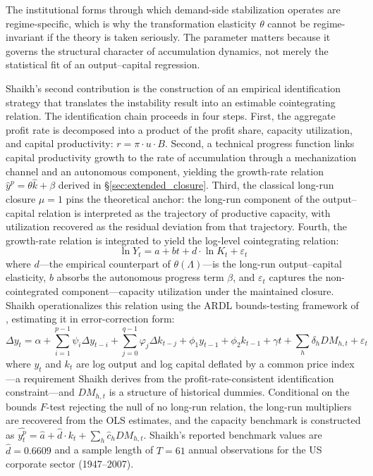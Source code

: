 The institutional forms through which demand-side stabilization operates are regime-specific, which is why the transformation elasticity $\theta$ cannot be regime-invariant if the theory is taken seriously. The parameter matters because it governs the structural character of accumulation dynamics, not merely the statistical fit of an output--capital regression.

Shaikh's second contribution is the construction of an empirical identification strategy that translates the instability result into an estimable cointegrating relation. The identification chain proceeds in four steps. First, the aggregate profit rate is decomposed into a product of the profit share, capacity utilization, and capital productivity: $r = \pi \cdot u \cdot B$. Second, a technical progress function links capital productivity growth to the rate of accumulation through a mechanization channel and an autonomous component, yielding the growth-rate relation $\hat{y}^p = \theta\hat{k} + \beta$ derived in \S\ref{sec:extended_closure}. Third, the classical long-run closure $\mu = 1$ pins the theoretical anchor: the long-run component of the output--capital relation is interpreted as the trajectory of productive capacity, with utilization recovered as the residual deviation from that trajectory. Fourth, the growth-rate relation is integrated to yield the log-level cointegrating relation:
%
\begin{equation}\label{eq:shaikh_coint_s33}
	\ln Y_t = a + bt + d \cdot \ln K_t + \varepsilon_t
\end{equation}
%
where $d$---the empirical counterpart of $\theta(\Lambda)$---is the long-run output--capital elasticity, $b$ absorbs the autonomous progress term $\beta$, and $\varepsilon_t$ captures the non-cointegrated component---capacity utilization under the maintained closure. Shaikh operationalizes this relation using the ARDL bounds-testing framework of \citet{Pesaran2001}, estimating it in error-correction form:
%
\begin{equation}\label{eq:shaikh_ecm_s33}
	\Delta y_t = \alpha + \sum_{i=1}^{p-1}\psi_i \Delta y_{t-i} + \sum_{j=0}^{q-1}\varphi_j \Delta k_{t-j} + \phi_1 y_{t-1} + \phi_2 k_{t-1} + \gamma t + \sum_h \delta_h DM_{h,t} + \varepsilon_t
\end{equation}
%
where $y_t$ and $k_t$ are log output and log capital deflated by a common price index---a requirement Shaikh derives from the profit-rate-consistent identification constraint---and $DM_{h,t}$ is a structure of historical dummies. Conditional on the bounds $F$-test rejecting the null of no long-run relation, the long-run multipliers are recovered from the OLS estimates, and the capacity benchmark is constructed as $\widehat{y_t^p} = \hat{a} + \hat{d} \cdot k_t + \sum_h \hat{c}_h DM_{h,t}$. Shaikh's reported benchmark values are $\hat{d} = 0.6609$ and a sample length of $T = 61$ annual observations for the US corporate sector (1947--2007).

